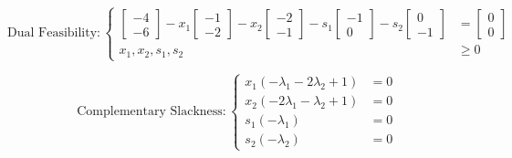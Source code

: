 \begin{equation}\text{Dual Feasibility}:\left\{
\begin{aligned}
\begin{bmatrix}-4\\-6\end{bmatrix} - x_1\begin{bmatrix}-1\\-2\end{bmatrix} - 
x_2\begin{bmatrix}-2\\-1\end{bmatrix} -s_1\begin{bmatrix}-1\\0\end{bmatrix} - 
s_2\begin{bmatrix}0\\-1\end{bmatrix} &= \begin{bmatrix}0\\0\end{bmatrix}\\
x_1,x_2,s_1,s_2 & \geq 0
\end{aligned}
\right.\end{equation}

\begin{equation}\text{Complementary Slackness}:\left\{
    \begin{aligned}
    x_1(-\lambda_1 - 2\lambda_2 + 1) &= 0\\
    x_2(-2\lambda_1 - \lambda_2 + 1) &= 0\\
    s_1(-\lambda_1) &= 0\\
    s_2(-\lambda_2) &= 0
    \end{aligned}
    \right.\end{equation}

